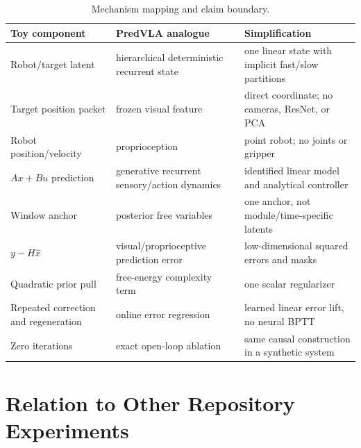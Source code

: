 \documentclass[11pt]{article}
\begin{document}
\begin{table}[H]
\centering
\small
\begin{tabular}{p{}p{}p{}}
\toprule
Toy component & PredVLA analogue & Simplification \\
\midrule
Robot/target latent & hierarchical deterministic recurrent state & one linear state with implicit fast/slow partitions \\
Target position packet & frozen visual feature & direct coordinate; no cameras, ResNet, or PCA \\
Robot position/velocity & proprioception & point robot; no joints or gripper \\
$A x+B u$ prediction & generative recurrent sensory/action dynamics & identified linear model and analytical controller \\
Window anchor & posterior free variables & one anchor, not module/time-specific latents \\
$y-H\hat x$ & visual/proprioceptive prediction error & low-dimensional squared errors and masks \\
Quadratic prior pull & free-energy complexity term & one scalar regularizer \\
Repeated correction and regeneration & online error regression & learned linear error lift, no neural BPTT \\
Zero iterations & exact open-loop ablation & same causal construction in a synthetic system \\
\bottomrule
\end{tabular}
\caption{Mechanism mapping and claim boundary.}
\label{tab:mapping}
\end{table}

\section{Relation to Other Repository Experiments}
\end{document}
